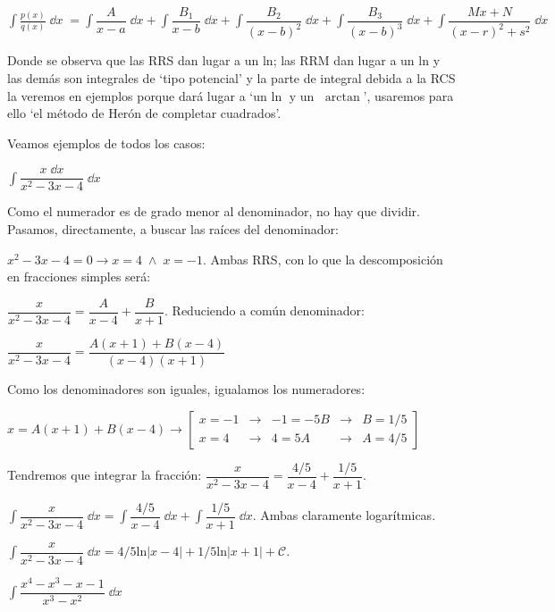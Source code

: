 \small{$\displaystyle \int \frac {p(x)}{q(x)}\; \dd x\; = \int \dfrac {A}{x-a}\; \dd x +\int \dfrac {B_1}{x-b}\;  \dd x +\int \dfrac {B_2}{(x-b)^2}\; \dd x +\int \dfrac {B_3}{(x-b)^3}\; \dd x +\int \dfrac {Mx+N}{(x-r)^2+s^2} \; \dd x$}\normalsize{

\vspace{4mm}\normalsize{Donde se observa que las RRS dan lugar a un $\mathrm{ln}$; las RRM dan lugar a un $\mathrm{ln}$ y las demás son integrales de `tipo potencial' y la parte de integral debida a la RCS la veremos en ejemplos porque dará lugar a `un $\mathrm{ln}\; \text { y un } \; \arctan $', usaremos para ello `el método de Herón de completar cuadrados'. }

Veamos ejemplos de todos los casos:

\begin{ejem}  $\displaystyle \int \dfrac {x \; \dd x}{x^2-3x-4}\; \dd x$

Como el numerador es de grado menor al denominador, no hay que dividir. Pasamos, directamente, a buscar las raíces del denominador:

$x^2-3x-4 = 0 \to x=4 \; \wedge \; x=-1$. Ambas RRS, con lo que la descomposición en fracciones simples será:

$ \dfrac {x }{x^2-3x-4} = \dfrac {A}{x-4} + \dfrac {B}{x+1}$. Reduciendo a común denominador:


$ \dfrac {x}{x^2-3x-4} = \dfrac {A(x+1)+B(x-4)}{(x-4)(x+1)}$

Como los denominadores son iguales, igualamos los numeradores:

$ x = A(x+1)+B(x-4) \to 
\left[ \begin{matrix} x=-1 & \to & -1=-5B &\to& B=1/5 \\ 
x=4 & \to & 4= 5A &\to& A=4/5 \end{matrix} \right]$

Tendremos que integrar la fracción: $ \dfrac {x }{x^2-3x-4} = \dfrac {4/5}{x-4} + \dfrac {1/5}{x+1}$.

$\displaystyle \int  \dfrac {x }{x^2-3x-4}\; \dd x = \int \dfrac {4/5}{x-4} \; \dd x + \int \dfrac {1/5}{x+1}\; \dd x $. Ambas claramente logarítmicas.

$ \displaystyle \int \dfrac {x }{x^2-3x-4} \; \dd x = 4/5 \mathrm{ln}|x-4|+1/5 \mathrm{ln}|x+1|+\mathcal C$.
	
\end{ejem}


\begin{ejem} $\displaystyle \int \dfrac {x^4-x^3-x-1}{x^3-x^2}\; \dd x$


\end{ejem}}
